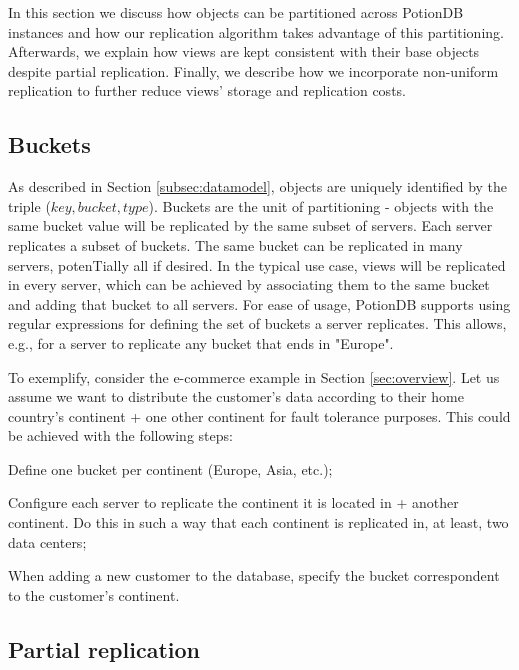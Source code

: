 \documentclass{vldb}
\begin{document}
In this section we discuss how objects can be partitioned across PotionDB instances and how our replication algorithm takes advantage of this partitioning.
Afterwards, we explain how views are kept consistent with their base objects despite partial replication.
Finally, we describe how we incorporate non-uniform replication to further reduce views' storage and replication costs.

\subsection{Buckets}
\label{subsec:buckets}
As described in Section \ref{subsec:datamodel}, objects are uniquely identified by the triple ($key, bucket, type$).
Buckets are the unit of partitioning - objects with the same bucket value will be replicated by the same subset of servers.
Each server replicates a subset of buckets.
The same bucket can be replicated in many servers, potenTially all if desired.
In the typical use case, views will be replicated in every server, which can be achieved by associating them to the same bucket and adding that bucket to all servers.
For ease of usage, PotionDB supports using regular expressions for defining the set of buckets a server replicates.
This allows, e.g., for a server to replicate any bucket that ends in "Europe".

To exemplify, consider the e-commerce example in Section \ref{sec:overview}.
Let us assume we want to distribute the customer's data according to their home country's continent + one other continent for fault tolerance purposes.
This could be achieved with the following steps:

\begin{compactenum}
	\item Define one bucket per continent (Europe, Asia, etc.);
	\item Configure each server to replicate the continent it is located in + another continent. Do this in such a way that each continent is replicated in, at least, two data centers;
	\item When adding a new customer to the database, specify the bucket correspondent to the customer's continent.
\end{compactenum}

\subsection{Partial replication}
\label{subsec:partial}
\end{document}
